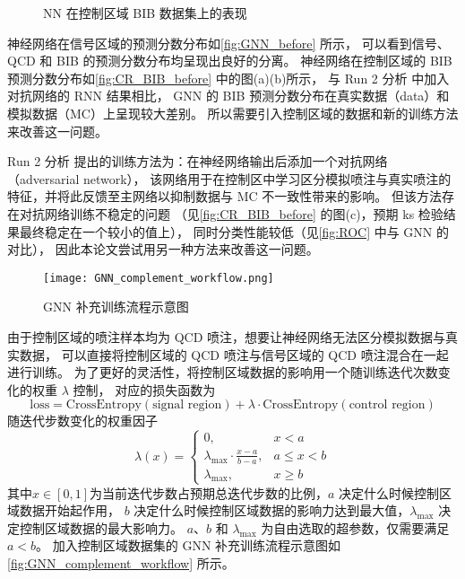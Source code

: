 \begin{figure}[ht]
    \centering
    \hfill
    \hfill
    \caption{NN 在控制区域 BIB 数据集上的表现}
    \label{fig:CR_BIB_before}
\end{figure}

神经网络在信号区域的预测分数分布如\autoref{fig:GNN_before} 所示，
可以看到信号、QCD 和 BIB 的预测分数分布均呈现出良好的分离。
神经网络在控制区域的 BIB 预测分数分布如\autoref{fig:CR_BIB_before} 中的图(a)(b)所示，
与 Run 2 分析\cite{ATLAS:2022zhj} 中加入对抗网络的 RNN 结果相比，
GNN 的 BIB 预测分数分布在真实数据（data）和模拟数据（MC）上呈现较大差别。
所以需要引入控制区域的数据和新的训练方法来改善这一问题。

Run 2 分析\cite{ATLAS:2022zhj} 提出的训练方法为：在神经网络输出后添加一个对抗网络（adversarial network），
该网络用于在控制区中学习区分模拟喷注与真实喷注的特征，并将此反馈至主网络以抑制数据与 MC 不一致性带来的影响。
但该方法存在对抗网络训练不稳定的问题
（见\autoref{fig:CR_BIB_before} 的图(c)，预期 ks 检验结果最终稳定在一个较小的值上），
同时分类性能较低（见\autoref{fig:ROC} 中与 GNN 的对比），
因此本论文尝试用另一种方法来改善这一问题。

\begin{figure}[ht]
    \centering
    \texttt{[image: GNN\_complement\_workflow.png]}
    \caption{GNN 补充训练流程示意图}
    \label{fig:GNN_complement_workflow}
\end{figure}

由于控制区域的喷注样本均为 QCD 喷注，想要让神经网络无法区分模拟数据与真实数据，
可以直接将控制区域的 QCD 喷注与信号区域的 QCD 喷注混合在一起进行训练。
为了更好的灵活性，将控制区域数据的影响用一个随训练迭代次数变化的权重 $\lambda$ 控制，
对应的损失函数为
\begin{equation}
    \text{loss} = \text{CrossEntropy}(\text{signal region}) +
    \lambda \cdot \text{CrossEntropy}(\text{control region})
\end{equation}
随迭代步数变化的权重因子
\begin{equation}
    \lambda(x) = \begin{cases}
        0,                                    & x < a        \\
        \lambda_{\max} \cdot \frac{x-a}{b-a}, & a \leq x < b \\
        \lambda_{\max},                       & x \geq b
    \end{cases}
\end{equation}
其中$x \in [0, 1]$为当前迭代步数占预期总迭代步数的比例，$a$ 决定什么时候控制区域数据开始起作用，
$b$ 决定什么时候控制区域数据的影响力达到最大值，$\lambda_{\max}$ 决定控制区域数据的最大影响力。
$a$、$b$ 和 $\lambda_{\max}$ 为自由选取的超参数，仅需要满足$a<b$。
加入控制区域数据集的 GNN 补充训练流程示意图如\autoref{fig:GNN_complement_workflow} 所示。


